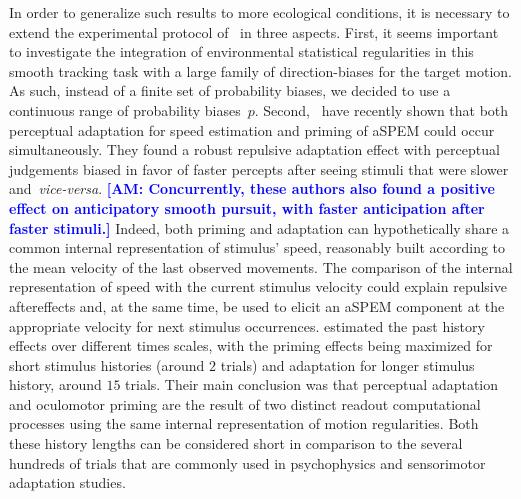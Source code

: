 \documentclass[12pt,english]{article}%
\newcommand{\citet}[1]{\textcite{#1}}
\newcommand{\seeFig}[1]{Figure~\ref{fig:#1}}
\newcommand{\AM}[1]{\textbf{\textcolor{blue}{[AM: #1]}}}
\begin{document}
In order to generalize such results to more ecological conditions,
it is necessary to extend the experimental protocol of~\citet{Montagnini2010} in three aspects.
First, it seems important to investigate the integration of environmental statistical regularities
in this smooth tracking task with
a large family of direction-biases for the target motion.
As such, instead of a finite set of probability biases, %
we decided to use a continuous range of probability biases~$p$.
Second,~\citet{Maus2015} have recently shown that
both perceptual adaptation for speed estimation
and priming of aSPEM could occur simultaneously.
They found a robust repulsive adaptation effect
with perceptual judgements biased in favor of faster percepts
after seeing stimuli that were slower and~\textit{vice-versa}. \AM{Concurrently, these authors also found
a positive effect on anticipatory smooth pursuit, with faster anticipation after faster stimuli.}
Indeed, both priming and adaptation can hypothetically share
a common internal representation of stimulus' speed,
reasonably built according to the mean velocity of the last observed movements.
The comparison of the internal representation of speed
with the current stimulus velocity could explain repulsive aftereffects and,
at the same time, be used to elicit
an aSPEM component at the appropriate velocity
for next stimulus occurrences.
\citet{Maus2015} estimated the past history effects over different times scales,
with the priming effects being maximized
for short stimulus histories (around $2$ trials) and
adaptation for longer stimulus history, around $15$ trials.
Their main conclusion was that
perceptual adaptation and oculomotor priming
are the result of two distinct readout computational processes using the same internal representation of motion regularities.
Both these history lengths can be considered
short in comparison to the several hundreds
of trials that are commonly used in psychophysics and sensorimotor adaptation studies.
\end{document}
